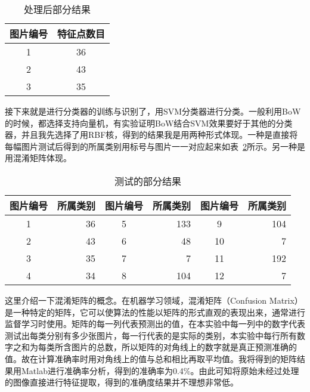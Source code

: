 \begin{table}[htb]
 \centering
  \begin{minipage}[t]{0.3\linewidth} %
  \caption{处理后部分结果}
  \label{tab:BBox}
   \begin{tabularx}{\linewidth}{c|c}
     \toprule[1.5pt]
      图片编号 &   特征点数目 \\
     \hline
      1 & 36\\\hline
      2 & 43\\\hline
      3 & 35\\
      \bottomrule[1.5pt]
    \end{tabularx}
  \end{minipage}
\end{table}

接下来就是进行分类器的训练与识别了，用SVM分类器进行分类。一般利用BoW的时候，都选择支持向量机，有实验证明BoW结合SVM效果要好于其他的分类器，并且我先选择了用RBF核，得到的结果我是用两种形式体现。一种是直接将每幅图片测试后得到的所属类别用标号与图片一一对应起来如表~\ref{tab:fenlei}所示。另一种是用混淆矩阵体现。

\begin{table}[htb]
 \centering
  \begin{minipage}[t]{0.85\linewidth} %
  \caption{测试的部分结果}
  \label{tab:fenlei}
   \begin{tabularx}{\linewidth}{c|r|c|r|c|r}
     \toprule[1.5pt]
      图片编号 &  所属类别  &  图片编号 & 所属类别 & 图片编号 &  所属类别 \\
     \hline
      1 & 36 & 5 & 133 & 9  & 104 \\\hline
      2 & 43 & 6 & 48  & 10 & 7   \\\hline
      3 & 35 & 7 & 7   & 11 & 192 \\\hline
      4 & 34 & 8 & 104 & 12 & 7   \\
      \bottomrule[1.5pt]
    \end{tabularx}
  \end{minipage}
\end{table}

这里介绍一下混淆矩阵的概念。在机器学习领域，混淆矩阵（Confusion Matrix）是一种特定的矩阵，它可以使算法的性能以矩阵的形式直观的表现出来，通常进行监督学习时使用。矩阵的每一列代表预测出的值，在本实验中每一列中的数字代表测试出每类分别有多少张图片，每一行代表的是实际的类别，本实验中每行所有数字之和为每类所含图片的总数，所以矩阵的对角线上的数字就是真正预测准确的值。故在计算准确率时用对角线上的值与总和相比再取平均值。我将得到的矩阵结果用Matlab进行准确率分析，得到的准确率为0.4\%。由此可知将原始未经过处理的图像直接进行特征提取，得到的准确度结果并不理想非常低。

